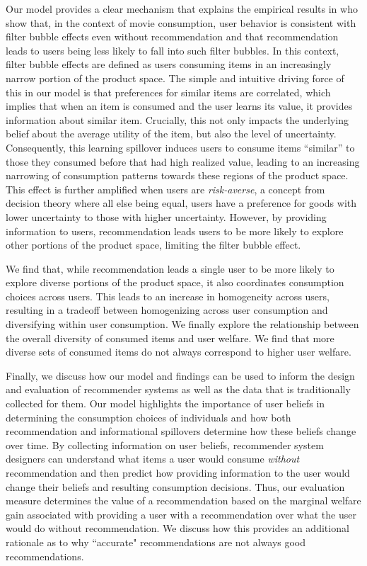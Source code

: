 \documentclass[format=acmsmall, review=false]{acmart}
\newcommand{\xhdr}[1]{\vspace{1mm} \noindent{\bf #1}}
\begin{document}
\xhdr{Our Contributions}
Our model provides a clear mechanism that explains the empirical results in \cite{nguyen2014exploring} who show that, in the context of movie consumption, user behavior is consistent with filter bubble effects even without recommendation and that recommendation leads to users being less likely to fall into such filter bubbles. In this context, filter bubble effects are defined as users consuming items in an increasingly narrow portion of the product space. The simple and intuitive driving force of this in our model is that preferences for similar items are correlated, which implies that when an item is consumed and the user learns its value, it provides information about similar item. Crucially, this not only impacts the underlying belief about the average utility of the item, but also the level of uncertainty. Consequently, this learning spillover induces users to consume items ``similar'' to those they consumed before that had high realized value, leading to an increasing narrowing of consumption patterns towards these regions of the product space. This effect is further amplified when users are \textit{risk-averse}, a concept from decision theory where all else being equal, users have a preference for goods with lower uncertainty to those with higher uncertainty. However, by providing information to users, recommendation leads users to be more likely to explore other portions of the product space, limiting the filter bubble effect.
\par
We find that, while recommendation leads a single user to be more likely to explore diverse portions of the product space, it also coordinates consumption choices across users. This leads to an increase in homogeneity across users, resulting in a tradeoff between homogenizing across user consumption and diversifying within user consumption. We finally explore the relationship between the overall diversity of consumed items and user welfare. We find that more diverse sets of consumed items do not always correspond to higher user welfare. 
\par
Finally, we discuss how our model and findings can be used to inform the design and evaluation of recommender systems as well as the data that is traditionally collected for them. Our model highlights the importance of user beliefs in determining the consumption choices of individuals and how both recommendation and informational spillovers determine how these beliefs change over time. By collecting information on user beliefs, recommender system designers can understand what items a user would consume \textit{without} recommendation and then predict how providing information to the user would change their beliefs and resulting consumption decisions. Thus, our evaluation measure determines the value of a recommendation based on the marginal welfare gain associated with providing a user with a recommendation over what the user would do without recommendation. We discuss how this provides an additional rationale as to why ``accurate" recommendations are not always good recommendations.
\par
\end{document}
